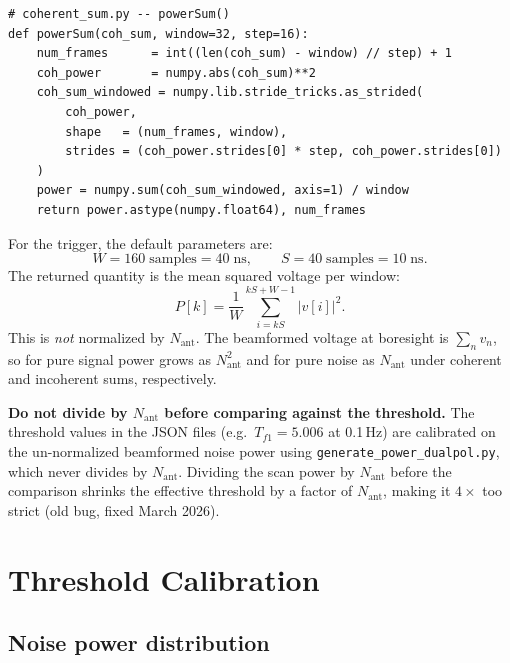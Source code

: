 \documentclass[11pt,letterpaper]{article}
\newenvironment{codebox}{%
  \begin{mdframed}[backgroundcolor=codebg,linewidth=0.5pt,innerleftmargin=6pt,innerrightmargin=6pt,innertopmargin=4pt,innerbottommargin=4pt]%
  \small}{\end{mdframed}}
\newenvironment{warningbox}{%
  \begin{mdframed}[backgroundcolor=warningbg,linewidth=1pt,frametitle={\small\textbf{Pitfall / Past Bug}},innerleftmargin=6pt]}%
  {\end{mdframed}}}
\begin{document}
\begin{codebox}
\begin{Verbatim}
# coherent_sum.py -- powerSum()
def powerSum(coh_sum, window=32, step=16):
    num_frames      = int((len(coh_sum) - window) // step) + 1
    coh_power       = numpy.abs(coh_sum)**2
    coh_sum_windowed = numpy.lib.stride_tricks.as_strided(
        coh_power,
        shape   = (num_frames, window),
        strides = (coh_power.strides[0] * step, coh_power.strides[0])
    )
    power = numpy.sum(coh_sum_windowed, axis=1) / window
    return power.astype(numpy.float64), num_frames
\end{Verbatim}
\end{codebox}

For the trigger, the default parameters are:
\[
  W = 160\;\mathrm{samples} = 40\;\mathrm{ns},
  \qquad
  S = 40\;\mathrm{samples} = 10\;\mathrm{ns}.
\]
The returned quantity is the mean squared voltage per window:
\[
  P[k] = \frac{1}{W} \sum_{i=kS}^{kS+W-1} \bigl|v[i]\bigr|^2.
\]
This is \emph{not} normalized by $N_\mathrm{ant}$.  The beamformed voltage
at boresight is $\sum_n v_n$, so for pure signal power grows as
$N_\mathrm{ant}^2$ and for pure noise as $N_\mathrm{ant}$ under coherent and
incoherent sums, respectively.

\begin{warningbox}
\textbf{Do not divide by $N_\mathrm{ant}$ before comparing against the
threshold.}  The threshold values in the JSON files (e.g.\ $T_{f1} = 5.006$
at 0.1\,Hz) are calibrated on the un-normalized beamformed noise power using
\texttt{generate\_power\_dualpol.py}, which never divides by
$N_\mathrm{ant}$. Dividing the scan power by $N_\mathrm{ant}$ before the
comparison shrinks the effective threshold by a factor of $N_\mathrm{ant}$,
making it $4\times$ too strict (old bug, fixed March 2026).
\end{warningbox}

\section{Threshold Calibration}

\subsection{Noise power distribution}
\end{document}
